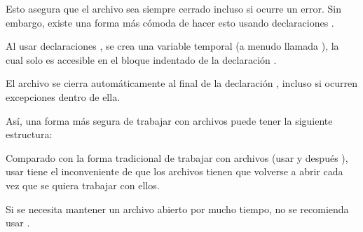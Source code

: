 Esto asegura que el archivo sea siempre cerrado incluso si ocurre un error.
Sin embargo, existe una forma más cómoda de hacer esto usando declaraciones .\medskip

Al usar declaraciones , se crea una variable temporal (a menudo llamada ), la cual solo es accesible en el bloque indentado de la declaración .


El archivo se cierra automáticamente al final de la declaración , incluso si ocurren excepciones dentro de ella.\medskip

Así, una forma más segura de trabajar con archivos puede tener la siguiente estructura:


Comparado con la forma tradicional de trabajar con archivos (usar  y después ), usar  tiene el inconveniente de que los archivos tienen que volverse a abrir cada vez que se quiera trabajar con ellos.\medskip

Si se necesita mantener un archivo abierto por mucho tiempo, no se recomienda usar .

\clearpage
